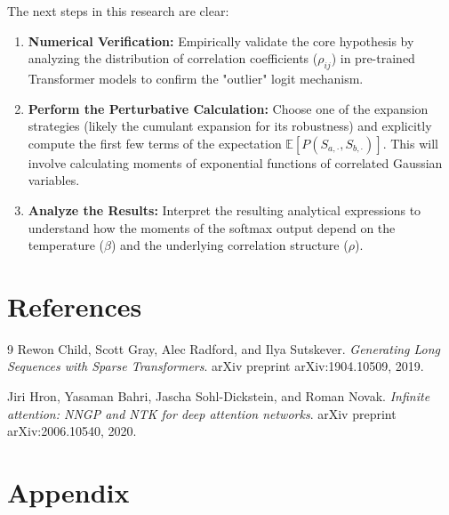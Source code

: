 \documentclass[12pt]{article}
\begin{document}
The next steps in this research are clear:
\begin{enumerate}
    \item \textbf{Numerical Verification:} Empirically validate the core hypothesis by analyzing the distribution of correlation coefficients ($\rho_{ij}$) in pre-trained Transformer models to confirm the "outlier" logit mechanism.
    \item \textbf{Perform the Perturbative Calculation:} Choose one of the expansion strategies (likely the cumulant expansion for its robustness) and explicitly compute the first few terms of the expectation $\mathbb{E}[P(S_{a, \cdot}, S_{b, \cdot})]$. This will involve calculating moments of exponential functions of correlated Gaussian variables.
    \item \textbf{Analyze the Results:} Interpret the resulting analytical expressions to understand how the moments of the softmax output depend on the temperature ($\beta$) and the underlying correlation structure ($\rho$).
\end{enumerate}

\section{References}
\begin{thebibliography}{9}
    Rewon Child, Scott Gray, Alec Radford, and Ilya Sutskever.
    \textit{Generating Long Sequences with Sparse Transformers}.
    arXiv preprint arXiv:1904.10509, 2019.

    Jiri Hron, Yasaman Bahri, Jascha Sohl-Dickstein, and Roman Novak.
    \textit{Infinite attention: NNGP and NTK for deep attention networks}.
    arXiv preprint arXiv:2006.10540, 2020.
\end{thebibliography}

\appendix
\section{Appendix}
\end{document}
